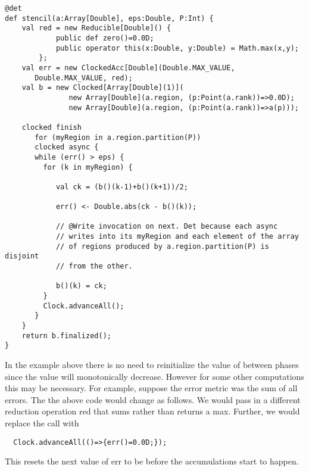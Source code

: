 \begin{example}
\begin{lstlisting}
@det
def stencil(a:Array[Double], eps:Double, P:Int) {
    val red = new Reducible[Double]() {
            public def zero()=0.0D;
            public operator this(x:Double, y:Double) = Math.max(x,y);
        };
    val err = new ClockedAcc[Double](Double.MAX_VALUE,
       Double.MAX_VALUE, red);
    val b = new Clocked[Array[Double](1)](
               new Array[Double](a.region, (p:Point(a.rank))=>0.0D);
               new Array[Double](a.region, (p:Point(a.rank))=>a(p)));

    clocked finish 
       for (myRegion in a.region.partition(P)) 
       clocked async {
       while (err() > eps) {
         for (k in myRegion) {

            val ck = (b()(k-1)+b()(k+1))/2;

            err() <- Double.abs(ck - b()(k));

            // @Write invocation on next. Det because each async
            // writes into its myRegion and each element of the array
            // of regions produced by a.region.partition(P) is disjoint
            // from the other.

            b()(k) = ck;
         }
         Clock.advanceAll();
       }
    }
    return b.finalized();
}
\end{lstlisting}
\end{example}


In the example above there is no need to reinitialize the value of
 between phases since the value will monotonically
decrease. However for some other computations this may be
necessary. For example, suppose the error metric was the sum of all
errors. The the above code would change as follows. We would pass in a
different reduction operation red that sums rather than returns a max.
Further, we would replace the  call with
\begin{lstlisting}
  Clock.advanceAll(()=>{err()=0.0D;});  
\end{lstlisting}

This resets the next value of err to be  before the accumulations
start to happen.


